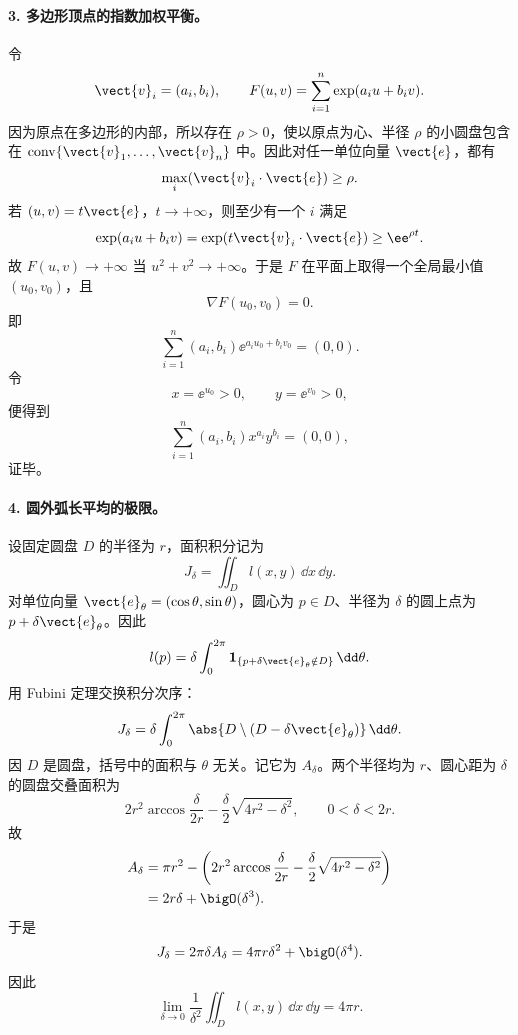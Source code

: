\paragraph{3. 多边形顶点的指数加权平衡。}
\begin{xsolution}
令
\[
  \vect{v}_i=(a_i,b_i),
  \qquad
  F(u,v)=\sum_{i=1}^n\exp(a_i u+b_i v).
\]
因为原点在多边形的内部，所以存在 $\rho>0$，使以原点为心、半径 $\rho$ 的小圆盘包含在 $\operatorname{conv}\{\vect{v}_1,\ldots,\vect{v}_n\}$ 中。因此对任一单位向量 $\vect{e}$，都有
\[
  \max_i(\vect{v}_i\cdot\vect{e})\ge\rho.
\]
若 $(u,v)=t\vect{e}$，$t\to+\infty$，则至少有一个 $i$ 满足
\[
  \exp(a_i u+b_i v)
  =\exp(t\vect{v}_i\cdot\vect{e})\ge\ee^{\rho t}.
\]
故 $F(u,v)\to+\infty$ 当 $u^2+v^2\to+\infty$。于是 $F$ 在平面上取得一个全局最小值 $(u_0,v_0)$，且
\[
  \nabla F(u_0,v_0)=0.
\]
即
\[
  \sum_{i=1}^n(a_i,b_i)\ee^{a_i u_0+b_i v_0}=(0,0).
\]
令
\[
  x=\ee^{u_0}>0,
  \qquad y=\ee^{v_0}>0,
\]
便得到
\[
  \sum_{i=1}^n(a_i,b_i)x^{a_i}y^{b_i}=(0,0),
\]
证毕。
\end{xsolution}

\paragraph{4. 圆外弧长平均的极限。}
\begin{xsolution}
设固定圆盘 $D$ 的半径为 $r$，面积积分记为
\[
  J_\delta=\iint_D l(x,y)\,\dd x\,\dd y.
\]
对单位向量 $\vect{e}_\theta=(\cos\theta,\sin\theta)$，圆心为 $p\in D$、半径为 $\delta$ 的圆上点为 $p+\delta\vect{e}_\theta$。因此
\[
  l(p)=\delta\int_0^{2\pi}
  \mathbf1_{\{p+\delta\vect{e}_\theta\notin D\}}\,\dd\theta.
\]
用 Fubini 定理交换积分次序：
\[
  J_\delta
  =\delta\int_0^{2\pi}
  \abs{D\setminus(D-\delta\vect{e}_\theta)}\,\dd\theta.
\]
因 $D$ 是圆盘，括号中的面积与 $\theta$ 无关。记它为 $A_\delta$。两个半径均为 $r$、圆心距为 $\delta$ 的圆盘交叠面积为
\[
  2r^2\arccos\frac{\delta}{2r}
  -\frac\delta2\sqrt{4r^2-\delta^2},
  \qquad0<\delta<2r.
\]
故
\begin{align*}
  A_\delta
  &=\pi r^2-\left(
  2r^2\arccos\frac{\delta}{2r}
  -\frac\delta2\sqrt{4r^2-\delta^2}
  \right)\\
  &=2r\delta+\bigO(\delta^3).
\end{align*}
于是
\[
  J_\delta=2\pi\delta A_\delta
  =4\pi r\delta^2+\bigO(\delta^4).
\]
因此
\[
  \boxed{
  \lim_{\delta\to0}\frac1{\delta^2}\iint_Dl(x,y)\,\dd x\,\dd y
  =4\pi r}.
\]
\end{xsolution}

